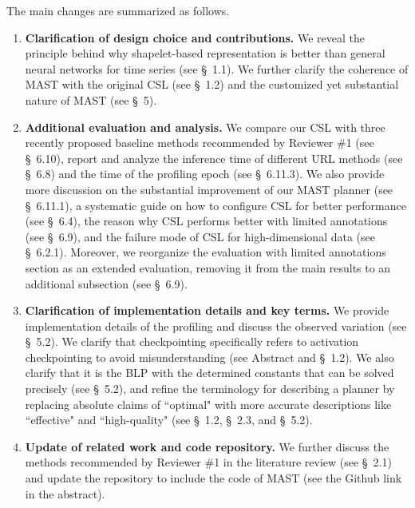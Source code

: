 \begin{sloppypar}
The main changes are summarized as follows.

\begin{enumerate}
    \item \textbf{Clarification of design choice and contributions.}  We reveal the principle behind why shapelet-based representation is better than general neural networks for time series (see \S~1.1). We further clarify the coherence of MAST with the original CSL (see \S~1.2) and the customized yet substantial nature of MAST (see \S~5).  

    \item \textbf{Additional evaluation and analysis.} We compare our CSL with three recently proposed baseline methods recommended by Reviewer \#1 (see \S~6.10), report and analyze the inference time of different URL methods (see \S~6.8) and the time of the profiling epoch (see \S~6.11.3). We also provide more discussion on the substantial improvement of our MAST planner (see \S~6.11.1), a systematic guide on how to configure CSL for better performance (see \S~6.4), the reason why CSL performs better with limited annotations (see \S~6.9), and the failure mode of CSL for high-dimensional data (see \S~6.2.1). Moreover, we reorganize the evaluation with limited annotations section as an extended evaluation, removing it from the main results to an additional subsection (see \S~6.9).

    \item \textbf{Clarification of implementation details and key terms.} We provide implementation details of the profiling and discuss the observed variation (see \S~5.2). We clarify that checkpointing specifically refers to activation checkpointing to avoid misunderstanding (see Abstract and \S~1.2). We also clarify that it is the BLP with the determined constants that can be solved precisely (see \S~5.2), and refine the terminology for describing a planner by replacing absolute claims of ``optimal" with more accurate descriptions like ``effective" and ``high-quality" (see \S~1.2, \S~2.3, and \S~5.2).

    \item \textbf{Update of related work and code repository.} We further discuss the methods recommended by Reviewer \#1 in the literature review (see \S~2.1) and update the repository to include the code of MAST (see the Github link in the abstract).
\end{enumerate}
\vspace{-0.5ex}


\end{sloppypar}
